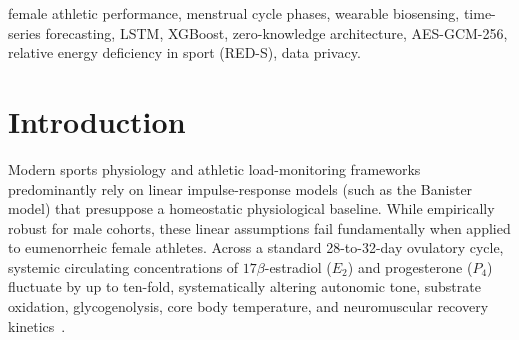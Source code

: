 \documentclass[conference]{IEEEtran}
\begin{document}
\begin{abstract}
To guarantee absolute data sovereignty, qualitative symptom logs and private reflections are encrypted client-side using Authenticated Encryption with Associated Data (AES-GCM-256) with PBKDF2 key derivation ($100{,}000$ iterations). The database persistence layer possesses zero knowledge of master passphrases or unencrypted records, achieving semantic security under adaptive chosen-ciphertext attacks (IND-CCA2). The framework was evaluated on an empirical-synthetic unified cohort of $N = 4{,}200$ longitudinal menstrual cycles ($118{,}440$ daily observations from $322$ subjects), partitioned strictly by subject ID. Experimental results demonstrate $90.1\%$ phase classification accuracy (macro F1 = $0.90$), an RMSE of $4.8$ on athletic strain estimation, an $R^2$ of $0.862$ on recovery latency, sub-millisecond edge inference, negligible cryptographic overhead ($8.4$~ms encryption latency), and an empirical database Shannon entropy of $7.989$~bits/byte, confirming the feasibility of mathematically private, hormone-synchronized sports conditioning.
\end{abstract}

\begin{IEEEkeywords}
female athletic performance, menstrual cycle phases, wearable biosensing, time-series forecasting, LSTM, XGBoost, zero-knowledge architecture, AES-GCM-256, relative energy deficiency in sport (RED-S), data privacy.
\end{IEEEkeywords}

\section{Introduction}
Modern sports physiology and athletic load-monitoring frameworks predominantly rely on linear impulse-response models (such as the Banister model) that presuppose a homeostatic physiological baseline. While empirically robust for male cohorts, these linear assumptions fail fundamentally when applied to eumenorrheic female athletes. Across a standard 28-to-32-day ovulatory cycle, systemic circulating concentrations of $17\beta$-estradiol ($E_2$) and progesterone ($P_4$) fluctuate by up to ten-fold, systematically altering autonomic tone, substrate oxidation, glycogenolysis, core body temperature, and neuromuscular recovery kinetics~\cite{bruinvels2022}.
\end{document}

